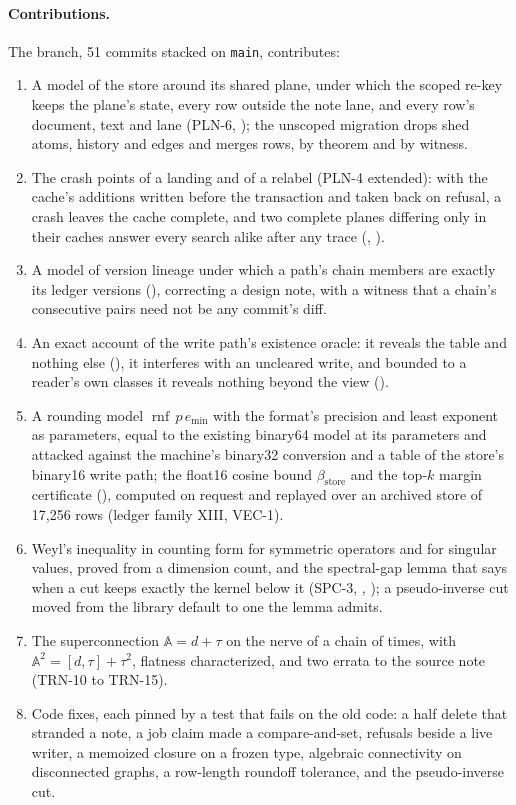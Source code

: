\documentclass[11pt]{article}
\theoremstyle{plain}
\theoremstyle{definition}
\theoremstyle{remark}
\newcommand{\rnf}{\operatorname{rnf}}
\newcommand{\betaS}{\beta_{\mathrm{store}}}
\newcommand{\A}{\mathbb{A}}
\begin{document}
\paragraph{Contributions.} The branch, 51 commits stacked on \texttt{main}, contributes:
\begin{enumerate}
  \item A model of the store around its shared plane, under which the scoped re-key keeps the
  plane's state, every row outside the note lane, and every row's document, text and lane
  (PLN-6, ); the unscoped migration drops shed atoms,
  history and edges and merges rows, by theorem and by witness.
  \item The crash points of a landing and of a relabel (PLN-4 extended): with the cache's
  additions written before the transaction and taken back on refusal, a crash leaves the cache
  complete, and two complete planes differing only in their caches answer every search alike
  after any trace (,
  ).
  \item A model of version lineage under which a path's chain members are exactly its ledger
  versions (), correcting a design note, with a
  witness that a chain's consecutive pairs need not be any commit's diff.
  \item An exact account of the write path's existence oracle: it reveals the table and nothing
  else (), it interferes with an uncleared write, and
  bounded to a reader's own classes it reveals nothing beyond the view
  ().
  \item A rounding model $\rnf\,p\,e_{\min}$ with the format's precision and least exponent as
  parameters, equal to the existing binary64 model at its parameters and attacked against the
  machine's binary32 conversion and a table of the store's binary16 write path; the float16
  cosine bound $\betaS$ and the top-$k$ margin certificate
  (), computed on request and replayed over an archived store
  of 17,256 rows (ledger family XIII, VEC-1).
  \item Weyl's inequality in counting form for symmetric operators and for singular values,
  proved from a dimension count, and the spectral-gap lemma that says when a cut keeps exactly
  the kernel below it (SPC-3, ,
  ); a pseudo-inverse cut moved from the library default
  to one the lemma admits.
  \item The superconnection $\A = d + \tau$ on the nerve of a chain of times, with
  $\A^2 = [d, \tau] + \tau^2$, flatness characterized, and two errata to the source note (TRN-10
  to TRN-15).
  \item Code fixes, each pinned by a test that fails on the old code: a half delete that stranded
  a note, a job claim made a compare-and-set, refusals beside a live writer, a memoized closure on
  a frozen type, algebraic connectivity on disconnected graphs, a row-length roundoff tolerance,
  and the pseudo-inverse cut.
\end{enumerate}
\end{document}
